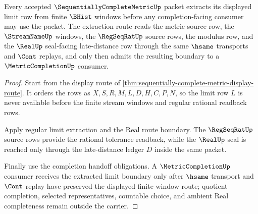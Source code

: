 \begin{theorem}
\label{thm:sequentially-complete-metric-window-limit-extraction}
Every accepted $\SequentiallyCompleteMetricUp$ packet extracts its displayed limit row from finite $\BHist$ windows before any completion-facing consumer may use the packet. The extraction route reads the metric source row, the $\StreamNameUp$ windows, the $\RegSeqRatUp$ source rows, the modulus row, and the $\RealUp$ seal-facing late-distance row through the same $\hsame$ transports and $\Cont$ replays, and only then admits the resulting boundary to a $\MetricCompletionUp$ consumer.
\end{theorem}
\begin{proof}
Start from the display route of \autoref{thm:sequentially-complete-metric-display-route}. It orders the rows as $X,S,R,M,L,D,H,C,P,N$, so the limit row $L$ is never available before the finite stream windows and regular rational readback rows.

Apply regular limit extraction and the Real route boundary. The $\RegSeqRatUp$ source rows provide the rational tolerance readback, while the $\RealUp$ seal is reached only through the late-distance ledger $D$ inside the same packet.

Finally use the completion handoff obligations. A $\MetricCompletionUp$ consumer receives the extracted limit boundary only after $\hsame$ transport and $\Cont$ replay have preserved the displayed finite-window route; quotient completion, selected representatives, countable choice, and ambient Real completeness remain outside the carrier.
\end{proof}

